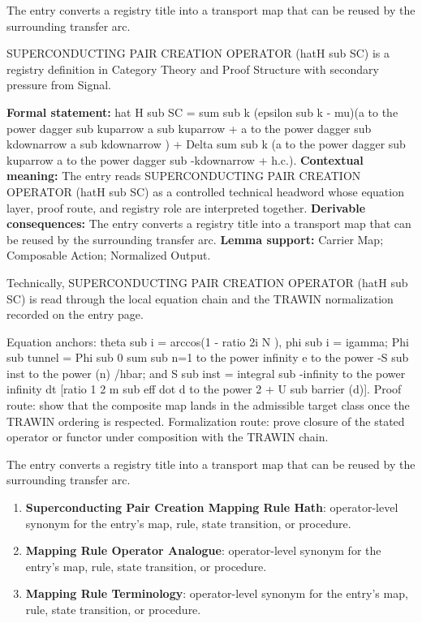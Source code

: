 The entry converts a registry title into a transport map that can be reused by the surrounding transfer arc.
\clearpage


\begingroup\small
{}
SUPERCONDUCTING PAIR CREATION OPERATOR (hatH sub SC) is a registry definition in Category Theory and Proof Structure with secondary pressure from Signal.

\begingroup\footnotesize\setlength{\emergencystretch}{3em}\sloppy
\textbf{Formal statement:} hat H sub SC = sum sub k (epsilon sub k - mu)(a to the power dagger sub kuparrow a sub kuparrow + a to the power dagger sub kdownarrow a sub kdownarrow ) + Delta sum sub k (a to the power dagger sub kuparrow a to the power dagger sub -kdownarrow + h.c.). \textbf{Contextual meaning:} The entry reads SUPERCONDUCTING PAIR CREATION OPERATOR (hatH sub SC) as a controlled technical headword whose equation layer, proof route, and registry role are interpreted together. \textbf{Derivable consequences:} The entry converts a registry title into a transport map that can be reused by the surrounding transfer arc. \textbf{Lemma support:} Carrier Map; Composable Action; Normalized Output.\par
\endgroup

Technically, SUPERCONDUCTING PAIR CREATION OPERATOR (hatH sub SC) is read through the local equation chain and the TRAWIN normalization recorded on the entry page.

Equation anchors: theta sub i = arccos(1 - ratio 2i N ), phi sub i = igamma; Phi sub tunnel = Phi sub 0 sum sub n=1 to the power infinity e to the power -S sub inst to the power (n) /hbar; and S sub inst = integral sub -infinity to the power infinity dt [ratio 1 2 m sub eff dot d to the power 2 + U sub barrier (d)]. Proof route: show that the composite map lands in the admissible target class once the TRAWIN ordering is respected. Formalization route: prove closure of the stated operator or functor under composition with the TRAWIN chain.

The entry converts a registry title into a transport map that can be reused by the surrounding transfer arc.
\endgroup

\begin{enumerate}[leftmargin=1.6em,itemsep=6pt,topsep=4pt]
\item \textbf{Superconducting Pair Creation Mapping Rule Hath}: operator-level synonym for the entry's map, rule, state transition, or procedure.
\item \textbf{Mapping Rule Operator Analogue}: operator-level synonym for the entry's map, rule, state transition, or procedure.
\item \textbf{Mapping Rule Terminology}: operator-level synonym for the entry's map, rule, state transition, or procedure.
\end{enumerate}

